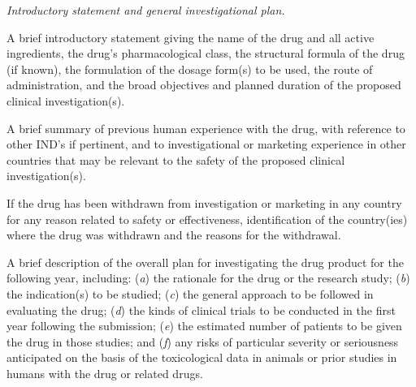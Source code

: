 \documentclass[11pt]{article}
\begin{document}
\begin{description}[leftmargin=0.5cm,style=sameline]
\item[(3)] \textit{Introductory statement and general investigational plan.}
\begin{description}[leftmargin=0.8cm,style=sameline]
\item[(i)] A brief introductory statement giving the name of the drug and all active ingredients, the drug's pharmacological class, the structural formula of the drug (if known), the formulation of the dosage form(s) to be used, the route of administration, and the broad objectives and planned duration of the proposed clinical investigation(s).
\item[(ii)] A brief summary of previous human experience with the drug, with reference to other IND's if pertinent, and to investigational or marketing experience in other countries that may be relevant to the safety of the proposed clinical investigation(s).
\item[(iii)] If the drug has been withdrawn from investigation or marketing in any country for any reason related to safety or effectiveness, identification of the country(ies) where the drug was withdrawn and the reasons for the withdrawal.
\item[(iv)] A brief description of the overall plan for investigating the drug product for the following year, including: (\textit{a}) the rationale for the drug or the research study; (\textit{b}) the indication(s) to be studied; (\textit{c}) the general approach to be followed in evaluating the drug; (\textit{d}) the kinds of clinical trials to be conducted in the first year following the submission; (\textit{e}) the estimated number of patients to be given the drug in those studies; and (\textit{f}) any risks of particular severity or seriousness anticipated on the basis of the toxicological data in animals or prior studies in humans with the drug or related drugs.
\end{description}

\item[(4)] [Reserved]


\end{description}
\end{document}
